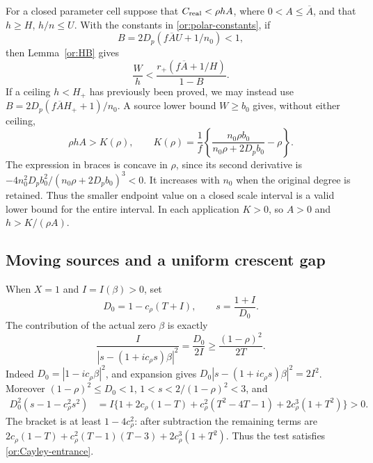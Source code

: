 \documentclass[11pt,reqno]{amsart}
\numberwithin{equation}{section}
\theoremstyle{definition}
\theoremstyle{remark}
\begin{document}
For a closed parameter cell suppose that
$C_{\rm real}<\rho h A$, where $0<A\le\overline A$, and that
$h\ge H$, $h/n\le U$.  With the constants in
\eqref{or:polar-constants}, if
\begin{equation}\label{or:HB-cell-denominator}
              B=2D_p(f\overline A U+1/n_0)<1,
\end{equation}
then Lemma~\ref{or:HB} gives
\begin{equation}\label{or:HB-cell}
                  \frac Wh<\frac{r_+(f\overline A+1/H)}{1-B}.
\end{equation}
If a ceiling $h<H_+$ has previously been proved, we may instead use
$B=2D_p(f\overline A H_++1)/n_0$.  A source lower bound $W\ge b_0$
gives, without either ceiling,
\begin{equation}\label{or:direct-K}
 \rho h A>K(\rho),\qquad
 K(\rho)=\frac1f\left\{\frac{n_0\rho b_0}
                         {n_0\rho+2D_p b_0}-\rho\right\}.
\end{equation}
The expression in braces is concave in $\rho$, since its second
derivative is $-4n_0^2D_pb_0^2/(n_0\rho+2D_pb_0)^3<0$.
It increases with $n_0$ when the original degree is retained.  Thus
the smaller endpoint value on a closed scale interval is a valid
lower bound for the entire interval.  In each application $K>0$,
so $A>0$ and $h>K/(\rho A)$.

\subsection{Moving sources and a uniform crescent gap}

When $X=1$ and $I=I(\beta)>0$, set
\begin{equation}\label{or:moving-test}
 D_0=1-c_\rho(T+I),\qquad s=\frac{1+I}{D_0}.
\end{equation}
The contribution of the actual zero $\beta$ is exactly
\begin{equation}\label{or:moving-weight}
 \frac{I}{|s-(1+ic_\rho s)\beta|^2}
       =\frac{D_0}{2I}\ge\frac{(1-\rho)^2}{2T}.
\end{equation}
Indeed $D_0=|1-ic_\rho\beta|^2$, and expansion gives
$D_0|s-(1+ic_\rho s)\beta|^2=2I^2$.
Moreover $(1-\rho)^2\le D_0<1$, $1<s<2/(1-\rho)^2<3$, and
\begin{align}
 D_0^2(s-1-c_\rho^2s^2)
 &=I\{1+2c_\rho(1-T)+c_\rho^2(T^2-4T-1)
                      +2c_\rho^3(1+T^2)\}>0.\label{or:moving-domain}
\end{align}
The bracket is at least $1-4c_\rho^2$: after subtraction the
remaining terms are
$2c_\rho(1-T)+c_\rho^2(T-1)(T-3)+2c_\rho^3(1+T^2)$.
Thus the test satisfies \eqref{or:Cayley-entrance}.
\end{document}
